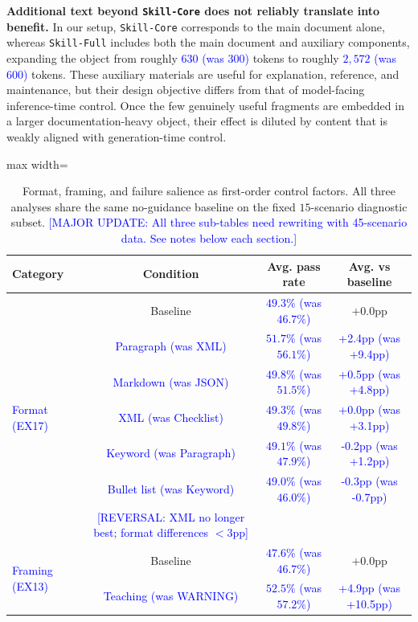 \documentclass{article}
\newcommand{\blue}[1]{\textcolor{blue}{#1}}
\newcommand{\nbf}[1]{{\noindent \textbf{#1}}}
\begin{document}
\nbf{Additional text beyond \texttt{Skill-Core} does not reliably translate into benefit.}
In our setup, \texttt{Skill-Core} corresponds to the main document alone, whereas \texttt{Skill-Full} includes both the main document and auxiliary components, expanding the object from roughly \blue{$630$ (was $300$)} tokens to roughly \blue{$2{,}572$ (was $600$)} tokens. 
These auxiliary materials are useful for explanation, reference, and maintenance, but their design objective differs from that of model-facing inference-time control. 
Once the few genuinely useful fragments are embedded in a larger documentation-heavy object, their effect is diluted by content that is weakly aligned with generation-time control.

\begin{table}[t]
\centering
\caption{Format, framing, and failure salience as first-order control factors. All three analyses share the same no-guidance baseline on the fixed $15$-scenario diagnostic subset. \blue{[MAJOR UPDATE: All three sub-tables need rewriting with 45-scenario data. See notes below each section.]}}
\label{tab:format_framing}
\begin{adjustbox}{max width=\columnwidth}
\begin{tabular}{lccc}
\toprule
\textbf{Category} & \textbf{Condition} & \textbf{Avg. pass rate} & \textbf{Avg. vs baseline} \\
\midrule
\multirow{7}{*}{\blue{Format (EX17)}}
& Baseline & \blue{$49.3\%$ (was $46.7\%$)} & $+0.0$pp \\
& \cellcolor{bestRow} \blue{Paragraph (was XML)} & \cellcolor{bestRow} \blue{$51.7\%$ (was $56.1\%$)} & \cellcolor{bestRow}\blue{+2.4pp (was +9.4pp)} \\
& \blue{Markdown (was JSON)} & \blue{$49.8\%$ (was $51.5\%$)} & \blue{+0.5pp (was +4.8pp)} \\
& \blue{XML (was Checklist)} & \blue{$49.3\%$ (was $49.8\%$)} & \blue{+0.0pp (was +3.1pp)} \\
& \blue{Keyword (was Paragraph)} & \blue{$49.1\%$ (was $47.9\%$)} & \blue{-0.2pp (was +1.2pp)} \\
& \blue{Bullet list (was Keyword)} & \blue{$49.0\%$ (was $46.0\%$)} & \blue{-0.3pp (was -0.7pp)} \\
& \blue{[REVERSAL: XML no longer best; format differences $<$3pp]} & & \\
\midrule
\multirow{6}{*}{\blue{Framing (EX13)}}
& Baseline & \blue{$47.6\%$ (was $46.7\%$)} & $+0.0$pp \\
& \cellcolor{bestRow} \blue{Teaching (was WARNING)} & \cellcolor{bestRow} \blue{$52.5\%$ (was $57.2\%$)} & \cellcolor{bestRow}\blue{+4.9pp (was +10.5pp)} \\

\end{tabular}
\end{adjustbox}
\end{table}
\end{document}
